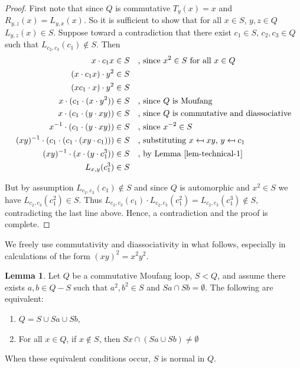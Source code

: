 \documentclass[12pt]{report}
\theoremstyle{definition}
\newtheorem{lem}[thm]{Lemma}
\begin{document}
\begin{proof}
  First note that since $Q$ is commutative $T_y(x) = x$ and $R_{y, z}(x) = L_{y, x}(x)$. So it is
    sufficient to show that for all $x\in S$, $y, z\in Q$ $L_{y, z}(x) \in S$. Suppose toward a
    contradiction that there exist $c_1\in S$, $c_2, c_3\in Q$ such that $L_{c_2, c_3}(c_1)\notin S$. Then
  \begin{alignat*}{2}
    x\cdot c_1 x &\in S &&\text{, since $x^2\in S$ for all $x\in Q$}\\
    (x\cdot c_1 x)\cdot y^2 &\in S &&\\
    (xc_1\cdot x)\cdot y^2 &\in S &&\\
    x\cdot(c_1\cdot (x\cdot y^2)) &\in S &&\text{, since $Q$ is Moufang}\\
    x\cdot (c_1\cdot (y\cdot xy)) &\in S &&\text{, since $Q$ is commutative and diassociative}\\
    x^{-1}\cdot(c_1\cdot(y\cdot xy)) &\in S &&\text{, since $x^{-2}\in S$}\\
    (xy)^{-1}\cdot(c_1\cdot(c_1\cdot (xy\cdot c_1))) &\in S
      &&\text{, substituting $x\mapsfrom xy$, $y\mapsfrom c_1$}\\
    (xy)^{-1}\cdot (x\cdot(y\cdot c_1^3)) &\in S &&\text{, by Lemma \ref{lem-technical-1}}\\
    L_{x,y}(c_1^3) &\in S &&
  \end{alignat*}

  But by assumption $L_{c_2, c_3}(c_1)\notin S$ and since $Q$ is automorphic and $x^2\in S$ we have
    $L_{c_2, c_3}(c_1^2)\in S$. Thus
    $L_{c_2, c_3}(c_1)\cdot L_{c_2, c_3}(c_1^2) = L_{c_2, c_3}(c_1^3)\notin S$, contradicting
    the last line above. Hence, a contradiction and the proof is complete.
\end{proof}

We freely use commutativity and diassociativity in what follows, especially in
  calculations of the form $(xy)^2 = x^2 y^2$.

\begin{lem}\label{lem-comMoufang}
  Let $Q$ be a commutative Moufang loop, $S < Q$, and assume there exists $a,b\in Q- S$ such
    that $a^2,b^2\in S$ and $Sa\cap Sb=\emptyset$. The following are equivalent:
  \begin{enumerate}
    \item $Q = S\cup Sa\cup Sb$, 
    \item For all $x\in Q$, if $x\not\in S$, then $Sx\cap (Sa\cup Sb)\neq \emptyset$
  \end{enumerate}
  When these equivalent conditions occur, $S$ is normal in $Q$.
\end{lem}
\end{document}
